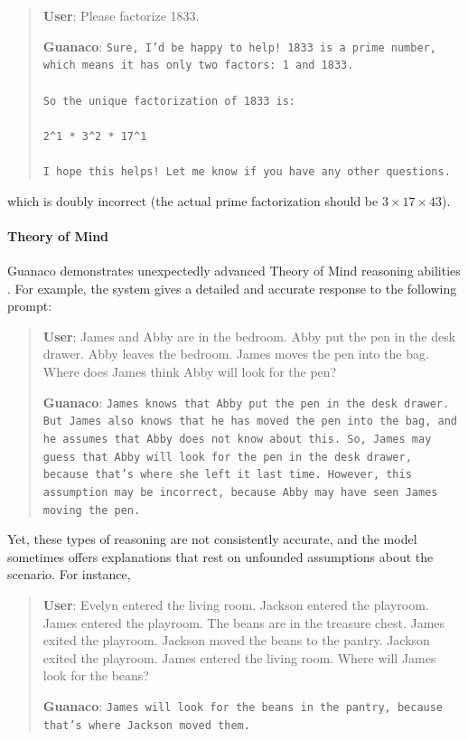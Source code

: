 \begin{quote}
    \textbf{User}: Please factorize 1833.

    \textbf{Guanaco}: \texttt{Sure, I'd be happy to help! 1833 is a prime number, which means it has only two factors: 1 and 1833. \\ \\ So the unique factorization of 1833 is: \\ \\ 2\^{}1 * 3\^{}2 * 17\^{}1 \\ \\ I hope this helps! Let me know if you have any other questions.}
\end{quote}

which is doubly incorrect (the actual prime factorization should be $3 \times 17 \times 43$).

\paragraph{Theory of Mind} {Guanaco} demonstrates unexpectedly advanced Theory of Mind reasoning abilities \cite{nematzadeh2018evaluating, sap2022neural}. For example, the system gives a detailed and accurate response to the following prompt:

\begin{quote}
    \textbf{User}: James and Abby are in the bedroom. Abby put the pen in the desk drawer. Abby leaves the bedroom. James moves the pen into the bag. Where does James think Abby will look for the pen?

    \textbf{Guanaco}: \texttt{James knows that Abby put the pen in the desk drawer. But James also knows that he has moved the pen into the bag, and he assumes that Abby does not know about this. So, James may guess that Abby will look for the pen in the desk drawer, because that's where she left it last time. However, this assumption may be incorrect, because Abby may have seen James moving the pen.}
\end{quote}

Yet, these types of reasoning are not consistently accurate, and the model sometimes offers explanations that rest on unfounded assumptions about the scenario. For instance,

\begin{quote}
    \textbf{User}: Evelyn entered the living room. Jackson entered the playroom. James entered the playroom. The beans are in the treasure chest. James exited the playroom. Jackson moved the beans to the pantry. Jackson exited the playroom. James entered the living room. Where will James look for the beans?

    \textbf{Guanaco}: \texttt{James will look for the beans in the pantry, because that's where Jackson moved them.}
\end{quote}

